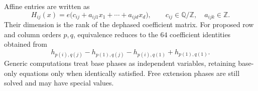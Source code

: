 \documentclass[11pt,a4paper]{article}
\theoremstyle{plain}
\theoremstyle{definition}
\numberwithin{equation}{section}
\begin{document}
Affine entries are written as
\begin{equation}\label{eq:affinephase}
 H_{ij}(x)=e\bigl(c_{ij}+a_{ij1}x_1+\cdots+a_{ijd}x_d\bigr),
 \qquad c_{ij}\in\mathbb{Q}/\mathbb{Z},\quad a_{ijk}\in\mathbb{Z}.
\end{equation}
Their dimension is the rank of the dephased coefficient matrix. For proposed row and column orders $p,q$, equivalence reduces to the $64$ coefficient identities obtained from
\begin{equation}\label{eq:dephase}
 h_{p(i),q(j)}-h_{p(1),q(j)}-h_{p(i),q(1)}+h_{p(1),q(1)}.
\end{equation}
Generic computations treat base phases as independent variables, retaining base-only equations only when identically satisfied. Free extension phases are still solved and may have special values.
\end{document}
